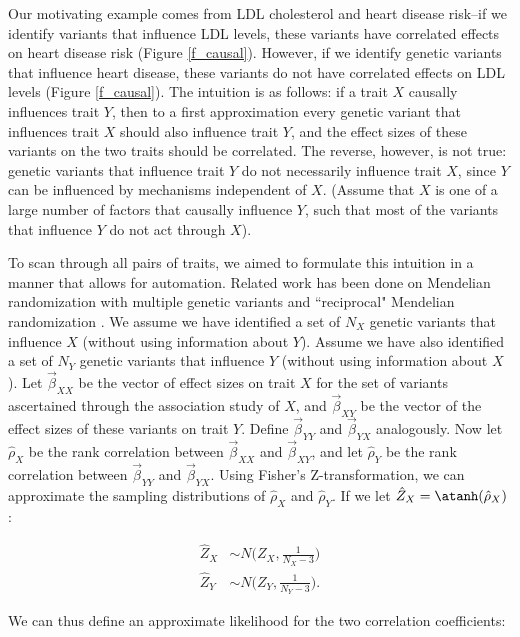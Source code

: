 \documentclass[11pt,titlepage]{article}
\begin{document}
Our motivating example comes from LDL cholesterol and heart disease risk--if we identify variants that influence LDL levels, these variants have correlated effects on heart disease risk (Figure \ref{f_causal}). However, if we identify genetic variants that influence heart disease, these variants do not have correlated effects on LDL levels (Figure \ref{f_causal}). The intuition is as follows: if a trait $X$ causally influences trait $Y$, then to a first approximation every genetic variant that influences trait $X$ should also influence trait $Y$, and the effect sizes of these variants on the two traits should be correlated. The reverse, however, is not true: genetic variants that influence trait $Y$ do not necessarily influence trait $X$, since $Y$ can be influenced by mechanisms independent of $X$. (Assume that $X$ is one of a large number of factors that causally influence $Y$, such that most of the variants that influence $Y$ do not act through $X$).

To scan through all pairs of traits, we aimed to formulate this intuition in a manner that allows for automation. Related work has been done on Mendelian randomization with multiple genetic variants \citep{Do:2013aa, Evans:2013aa, Davey-Smith:2014aa} and ``reciprocal" Mendelian randomization \citep{Timpson:2011aa}. We assume we have identified a set of $N_X$ genetic variants that influence $X$ (without using information about $Y$). Assume we have also identified a set of $N_Y$ genetic variants that influence $Y$ (without using information about $X$). Let $\vec \beta_{XX}$ be the vector of effect sizes on trait $X$ for the set of variants ascertained through the association study of $X$, and  $\vec \beta_{XY}$ be the vector of the effect sizes of these variants on trait $Y$. Define $\vec \beta_{YY}$ and $\vec \beta_{YX}$ analogously. Now let $\hat \rho_X$ be the rank correlation between $\vec \beta_{XX}$ and $\vec \beta_{XY}$,  and let $\hat \rho_Y$ be the rank correlation between $\vec \beta_{YY}$ and $\vec \beta_{YX}$. Using Fisher's Z-transformation, we can approximate the sampling distributions of  $\hat \rho_X$ and $\hat \rho_Y$. If we let $\hat Z_X = \atanh(\hat \rho_X)$:

\begin{align}
\hat Z_X &\sim N \bigg(Z_X, \frac{1}{N_X - 3} \bigg)\\
\hat Z_Y &\sim N \bigg(Z_Y, \frac{1}{N_ Y- 3} \bigg).
\end{align}

We can thus define an approximate likelihood for the two correlation coefficients:
\end{document}
